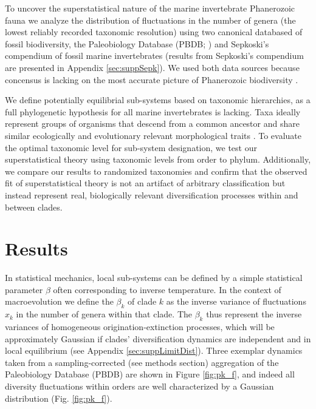 \documentclass[12pt]{article}
\let\citep=\cite
\begin{document}
To uncover the superstatistical nature of the marine invertebrate
Phanerozoic fauna we analyze the distribution of fluctuations in the
number of genera (the lowest reliably recorded taxonomic resolution)
using two canonical databased of fossil biodiversity, the Paleobiology
Database (PBDB; \citep{alroy08}) and Sepkoski's compendium
\citep{sepkoski1992} of fossil marine invertebrates (results from
Sepkoski's compendium are presented in Appendix
\ref{sec:suppSepk}). We used both data sources because concensus is
lacking on the most accurate picture of Phanerozoic biodiversity
\citep{marshall2010}.

We define potentially equilibrial sub-systems based on taxonomic
hierarchies, as a full phylogenetic hypothesis for all marine
invertebrates is lacking.  Taxa ideally represent groups of organisms
that descend from a common ancestor and share similar ecologically and
evolutionary relevant morphological traits \citep{mayr1965systZool,
  erwin2007}. To evaluate the optimal taxonomic level for sub-system
designation, we test our superstatistical theory using taxonomic
levels from order to phylum. Additionally, we compare our results to
randomized taxonomies and confirm that the observed fit of
superstatistical theory is not an artifact of arbitrary classification
but instead represent real, biologically relevant diversification
processes within and between clades.

\section*{Results}

In statistical mechanics, local sub-systems can be defined by a simple
statistical parameter $\beta$ often corresponding to inverse
temperature. In the context of macroevolution we define the $\beta_k$
of clade $k$ as the inverse variance of fluctuations $x_k$ in the
number of genera within that clade.  The $\beta_k$ thus represent the
inverse variances of homogeneous origination-extinction processes,
which will be approximately Gaussian if clades' diversification
dynamics are independent and in local equilibrium (see Appendix
\ref{sec:suppLimitDist}).  Three exemplar dynamics taken from a
sampling-corrected (see methods section) aggregation of the Paleobiology
Database (PBDB) \citep{alroy08} are shown in Figure \ref{fig:pk_f},
and indeed all diversity fluctuations within orders are well
characterized by a Gaussian distribution (Fig. \ref{fig:pk_f}).
\end{document}
